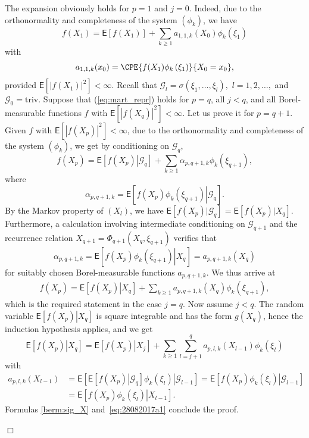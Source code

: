 \documentclass[bj]{imsart}
\newcommand{\proofendsign}{$\Box$}
\newenvironment{proof}{{\noindent \bf Proof }}
 {{\hspace*{\fill}\proofendsign\par\bigskip}}
\begin{document}
\begin{proof}
The expansion obviously holds for $p=1$ and $j=0$.
Indeed, due to the orthonormality and completeness
of the system $\left(\phi_{k}\right)$, we have
\[
f(X_{1})=\mathsf{E}\left[f(X_{1})\right]+\sum_{k\geq1}a_{1,1,k}(X_0)\phi_{k}(\xi_{1})
\]
with
\[
a_{1,1,k}(x_0)=\CPE{f(X_{1})\phi_{k}\left(\xi_{1}\right)}{X_0=x_0},
\]
provided $\mathsf{E}\left[\left|f(X_{1})\right|^{2}\right]<\infty.$
Recall that $\mathcal{G}_l=\sigma(\xi_{1},\ldots,\xi_{l}),$
$l=1,2,\ldots, $
and $\mathcal{G}_0=\mathrm{triv}$.
Suppose that (\ref{eq:mart_repr})
holds for $p=q$, all $j<q$, and all Borel-measurable functions
$f$ with $\mathsf{E}\left[|f(X_{q})|^2\right]<\infty$.
Let us prove it for $p=q+1$.
Given $f$ with $\mathsf{E}\left[|f(X_{p})|^2\right]<\infty$,
due to the orthonormality and completeness
of the system $\left(\phi_{k}\right)$, we get by
conditioning on $\mathcal{G}_{q}$,
\[
f(X_{p})=\mathsf{E}\left[\left.f(X_{p})\right|{\mathcal{G}}_q\right]+\sum_{k\geq1}\alpha_{p,q+1,k}\phi_{k}(\xi_{q+1}),
\]
where
\begin{equation*}
\alpha_{p,q+1,k}
=\mathsf{E}\left[\left.f(X_{p})\phi_{k}(\xi_{q+1})\right|\mathcal G_q\right].
\end{equation*}
By the Markov property of $(X_{l})$,
we have
$\mathsf{E}[f(X_{p})|\mathcal{G}_q]
=\mathsf{E}[f(X_{p})|X_{q}]$.
Furthermore, a calculation involving
intermediate conditioning on $\mathcal G_{q+1}$
and the recurrence relation
$X_{q+1}=\Phi_{q+1}(X_{q},\xi_{q+1})$
verifies that
\[
\alpha_{p,q+1,k}=\mathsf{E}\left[\left.f(X_{p})\phi_{k}(\xi_{q+1})\right|X_{q}\right]
=a_{p,q+1,k}(X_{q})
\]
for suitably chosen
Borel-measurable functions $a_{p,q+1,k}$.
We thus arrive at
\begin{align}
\label{berm:sig_X}
f(X_{p})=\mathsf{E}\left[\left.f(X_{p})\right|X_{q}\right]+\sum_{k\geq1}a_{p,q+1,k}(X_{q})\phi_{k}(\xi_{q+1}),
\end{align}
which is the required statement in the case $j=q$.
Now assume $j<q$.
The random variable
$\mathsf{E}\left[\left.f(X_{p})\right|X_{q}\right]$
is square integrable and has the form
$g(X_{q})$,
hence the induction hypothesis applies, and we get
\begin{equation}\label{eq:28082017a1}
\mathsf{E}\left[\left.f(X_{p})\right|X_{q}\right]=\mathsf{E}\left[\left.f(X_{p})\right|X_{j}\right]+\sum_{k\geq1}\sum_{l=j+1}^{q}a_{p,l,k}(X_{l-1})\phi_{k}(\xi_{l})
\end{equation}
with
\begin{align*}
a_{p,l,k}(X_{l-1}) &= \mathsf{E}\left[\left.\mathsf{E}\left[\left.f(X_{p})\right|\mathcal{G}_{q}\right]\phi_{k}(\xi_{l})\right|\mathcal{G}_{l-1}\right]
= \mathsf{E}\left[\left.f(X_{p})\phi_{k}(\xi_{l})\right|\mathcal{G}_{l-1}\right]\\
&=\mathsf{E}\left[\left.f(X_{p})\phi_{k}(\xi_{l})\right|X_{l-1}\right].
\end{align*}
Formulas \eqref{berm:sig_X}
and~\eqref{eq:28082017a1} conclude the proof.
\end{proof}
\end{document}
